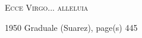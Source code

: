 \documentclass[10pt, letterpaper]{article}
\begin{document}
\newcommand{\red}[1]{\textcolor{red}{#1}}

\begin{center}\begin{huge}\textsc{Ecce Virgo... alleluia}\end{huge}\end{center}
\begin{center}1950 Graduale (Suarez), page(s) 445\end{center}


\def\greinitialformat#1{%
{\fontsize{31}{31}\selectfont #1}%
}

\gresetfirstlineaboveinitial{\small \textbf{}}{\small \textbf{}}
\commentary{{\small \emph{}}}

\grespaceabovelines=3mm

\end{document}
